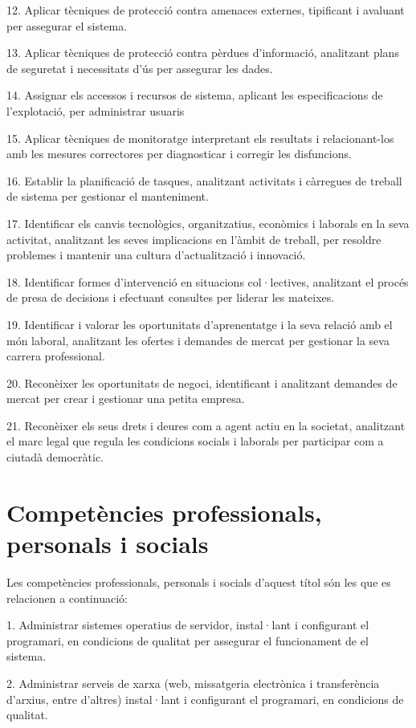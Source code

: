 \documentclass[catalan, a4paper, 12pt, titlepage]{article}
\begin{document}
12. Aplicar tècniques de protecció contra amenaces externes, tipificant i avaluant per assegurar el sistema.

13. Aplicar tècniques de protecció contra pèrdues d'informació, analitzant plans de seguretat i necessitats d'ús per assegurar les dades.

14. Assignar els accessos i recursos de sistema, aplicant les especificacions de l'explotació, per administrar usuaris

15. Aplicar tècniques de monitoratge interpretant els resultats i relacionant-los amb les mesures correctores per diagnosticar i corregir les disfuncions.

16. Establir la planificació de tasques, analitzant activitats i càrregues de treball de sistema per gestionar el manteniment.

17. Identificar els canvis tecnològics, organitzatius, econòmics i laborals en la seva activitat, analitzant les seves implicacions en l'àmbit de treball, per resoldre problemes i mantenir una cultura d'actualització i innovació.

18. Identificar formes d'intervenció en situacions col·lectives, analitzant el procés de presa de decisions i efectuant consultes per liderar les mateixes.

19. Identificar i valorar les oportunitats d'aprenentatge i la seva relació amb el món laboral, analitzant les ofertes i demandes de mercat per gestionar la seva carrera professional.

20. Reconèixer les oportunitats de negoci, identificant i analitzant demandes de mercat per crear i gestionar una petita empresa.

21. Reconèixer els seus drets i deures com a agent actiu en la societat, analitzant el marc legal que regula les condicions socials i laborals per participar com a ciutadà democràtic.

\section{Competències professionals, personals i socials}

Les competències professionals, personals i socials d'aquest títol són les que es relacionen a continuació:

1. Administrar sistemes operatius de servidor, instal·lant i configurant el programari, en condicions de qualitat per assegurar el funcionament de el sistema.

2. Administrar serveis de xarxa (web, missatgeria electrònica i transferència d'arxius, entre d'altres) instal·lant i configurant el programari, en condicions de qualitat.
\end{document}
